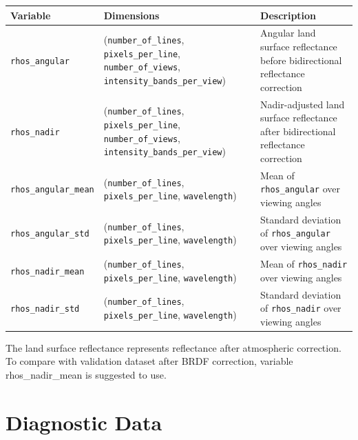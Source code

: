 \documentclass[
  11pt,
  letterpaper,
]{scrreprt}
\begin{document}
\begin{longtable}[]{@{}
  >{\raggedright\arraybackslash}p{}
  >{\raggedright\arraybackslash}p{}
  >{\raggedright\arraybackslash}p{}@{}}
\toprule\noalign{}
\begin{minipage}[b]{\linewidth}\raggedright
Variable
\end{minipage} & \begin{minipage}[b]{\linewidth}\raggedright
Dimensions
\end{minipage} & \begin{minipage}[b]{\linewidth}\raggedright
Description
\end{minipage} \\
\midrule\noalign{}
\endhead
\bottomrule\noalign{}
\endlastfoot
\texttt{rhos\_angular} & (\texttt{number\_of\_lines},
\texttt{pixels\_per\_line}, \texttt{number\_of\_views},
\texttt{intensity\_bands\_per\_view}) & Angular land surface reflectance
before bidirectional reflectance correction \\
\texttt{rhos\_nadir} & (\texttt{number\_of\_lines},
\texttt{pixels\_per\_line}, \texttt{number\_of\_views},
\texttt{intensity\_bands\_per\_view}) & Nadir-adjusted land surface
reflectance after bidirectional reflectance correction \\
\texttt{rhos\_angular\_mean} & (\texttt{number\_of\_lines},
\texttt{pixels\_per\_line}, \texttt{wavelength}) & Mean of
\texttt{rhos\_angular} over viewing angles \\
\texttt{rhos\_angular\_std} & (\texttt{number\_of\_lines},
\texttt{pixels\_per\_line}, \texttt{wavelength}) & Standard deviation of
\texttt{rhos\_angular} over viewing angles \\
\texttt{rhos\_nadir\_mean} & (\texttt{number\_of\_lines},
\texttt{pixels\_per\_line}, \texttt{wavelength}) & Mean of
\texttt{rhos\_nadir} over viewing angles \\
\texttt{rhos\_nadir\_std} & (\texttt{number\_of\_lines},
\texttt{pixels\_per\_line}, \texttt{wavelength}) & Standard deviation of
\texttt{rhos\_nadir} over viewing angles \\
\end{longtable}

The land surface reflectance represents reflectance after atmospheric
correction. To compare with validation dataset after BRDF correction,
variable rhos\_nadir\_mean is suggested to use.

\section{Diagnostic Data}\label{diagnostic-data}
\end{document}

